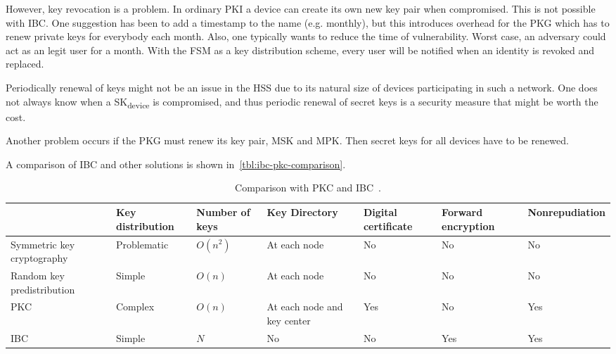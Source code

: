 However, key revocation is a problem.
In ordinary \gls{PKI} a device can create its own new key pair when compromised. 
This is not possible with \gls{IBC}.
One suggestion has been to add a timestamp to the \gls{name} (e.g. monthly), but this introduces overhead for the \gls{PKG} which has to renew private keys for everybody each month. 
Also, one typically wants to reduce the time of vulnerability. 
Worst case, an adversary could act as an legit user for a month.
With the \gls{FSM} as a key distribution scheme, every user will be notified when an identity is revoked and replaced.

Periodically renewal of keys might not be an issue in the \gls{HSS} due to its natural size of devices participating in such a network.
One does not always know when a SK\textsubscript{device} is compromised, and thus periodic renewal of secret keys is a security measure that might be worth the cost.

Another problem occurs if the \gls{PKG} must renew its key pair, \gls{MSK} and \gls{MPK}.
Then secret keys for all devices have to be renewed.

A comparison of \gls{IBC} and other solutions is shown in~\autoref{tbl:ibc-pkc-comparison}.
\begin{table}[h]\footnotesize
  \begin{tabular}[c]{ | p{2cm} | p{1.5cm} | p{1cm} | p{1.2cm} | p{1cm} | p{1.3cm} | p{1.8cm} |}
  \hline 
  & Key distribution & Number of keys & Key Directory & Digital certificate & Forward encryption & Nonrepudiation 	\\ \hline
  Symmetric key cryptography 	& Problematic 	& $O(n^2)$ 	& At each node 					& No 	& No 	& No 	\\ \hline 
  Random key predistribution 	& Simple 		& $O(n)$ 	& At each node 					& No 	& No 	& No 	\\ \hline
  PKC 							& Complex 		& $O(n)$ 	& At each node and key center 	& Yes 	& No 	& Yes 	\\ \hline
  IBC 							& Simple 		& $N$ 		& No 							& No 	& Yes 	& Yes 	\\ \hline
  \end{tabular}
  \caption[Comparison with PKC and IBC]{Comparison with PKC and IBC~\cite[Table 9.6]{Patil:2012:SWS:2464778}.}
  \label{tbl:ibc-pkc-comparison}
\end{table}

